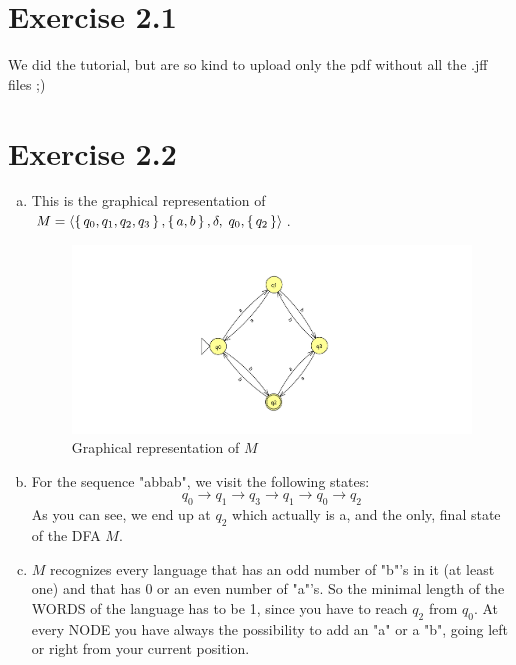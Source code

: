 \documentclass{article} %
\newcommand{\homeworkNumber}{2}
\begin{document}
\section*{Exercise \homeworkNumber.1}
We did the tutorial, but are so kind to upload only the pdf without all the
.jff files ;)

\section*{Exercise \homeworkNumber.2}
\begin{enumerate}[(a)]
	\item
	This is the graphical representation of $M = \left \langle
		\set{q_0, q_1, q_2, q_3}, \set{a, b}, \delta,\; q_0, \set{q_2}
		\right \rangle$.
	\begin{figure}[H]
		\includegraphics[width=\linewidth]{ex2a.png}
		\centering
		\caption{Graphical representation of $M$}
	\end{figure}

	\item
	For the sequence "abbab", we visit the following states:
	$$
	q_0 \to q_1 \to q_3 \to q_1 \to q_0 \to q_2
	$$
	As you can see, we end up at $q_2$ which actually is a, and the only, final state of the DFA $M$.

	\item
	$M$ recognizes every language that has an odd number of "b"'s in it (at least one) and that has 0 or
	an even number of "a"'s. So the minimal length of the WORDS of the language has to be 1, since you
	have to reach $q_2$ from $q_0$. At every NODE you have always the possibility to add an "a" or a "b",
	going left or right from your current position.

\end{enumerate}

\clearpage
\end{document}
